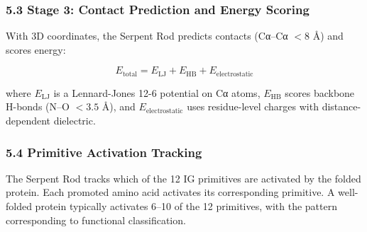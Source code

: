 \hypertarget{stage-3-contact-prediction-and-energy-scoring}{%
\subsubsection{5.3 Stage 3: Contact Prediction and Energy
Scoring}\label{stage-3-contact-prediction-and-energy-scoring}}

With 3D coordinates, the Serpent Rod predicts contacts (Cα--Cα \(< 8\)
Å) and scores energy:

\[E_{\text{total}} = E_{\text{LJ}} + E_{\text{HB}} + E_{\text{electrostatic}}\]

where \(E_{\text{LJ}}\) is a Lennard-Jones 12-6 potential on Cα atoms,
\(E_{\text{HB}}\) scores backbone H-bonds (N--O \(< 3.5\) Å), and
\(E_{\text{electrostatic}}\) uses residue-level charges with
distance-dependent dielectric.

\hypertarget{primitive-activation-tracking}{%
\subsubsection{5.4 Primitive Activation
Tracking}\label{primitive-activation-tracking}}

The Serpent Rod tracks which of the 12 IG primitives are activated by
the folded protein. Each promoted amino acid activates its corresponding
primitive. A well-folded protein typically activates 6--10 of the 12
primitives, with the pattern corresponding to functional classification.

